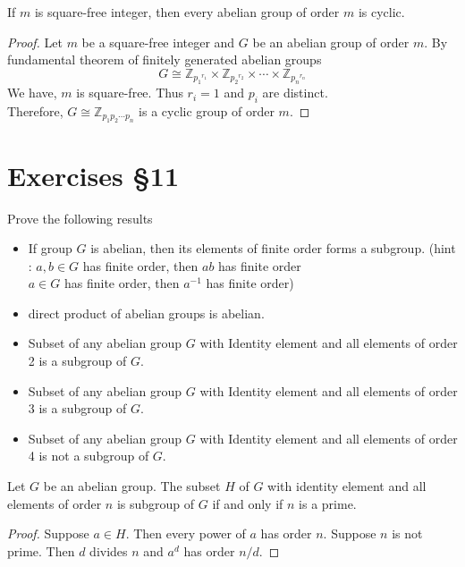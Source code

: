 \begin{theorem}
	If $m$ is square-free integer, then every abelian group of order $m$ is cyclic.
\end{theorem}
\begin{proof}
	Let $m$ be a square-free integer and $G$ be an abelian group of order $m$.
	By fundamental theorem of finitely generated abelian groups
	$$ G \cong \mathbb{Z}_{{p_1}^{r_1}} \times \mathbb{Z}_{{p_2}^{r_2}} \times \cdots \times \mathbb{Z}_{{p_n}^{r_n}}$$
	We have, $m$ is square-free. Thus $r_i = 1$ and $p_i$ are distinct.\\
	Therefore, $G \cong \mathbb{Z}_{p_1 p_2 \cdots p_n}$ is a cyclic group of order $m$.
\end{proof}
\pagebreak

\section{Exercises \S11}
\begin{remark}Prove the following results
	\begin{itemize}
		\item If group $G$ is abelian, then its elements of finite order forms a subgroup. %
			(hint : $a,b \in G$ has finite order, then $ab$ has finite order\\ $a \in G$ has finite order, then $a^{-1}$ has finite order)
		\item direct product of abelian groups is abelian.%
		\item Subset of any abelian group $G$ with Identity element and all elements of order 2 is a subgroup of $G$.%
		\item Subset of any abelian group $G$ with Identity element and all elements of order 3 is a subgroup of $G$.%
		\item Subset of any abelian group $G$ with Identity element and all elements of order 4 is not a subgroup of $G$.%
	\end{itemize}
\end{remark}

\begin{remark}
	Let $G$ be an abelian group. The subset $H$ of $G$ with identity element and all elements of order $n$ is subgroup of $G$ if and only if $n$ is a prime. %
\end{remark}
\begin{proof}
	Suppose $a \in H$. Then every power of $a$ has order $n$. Suppose $n$ is not prime. Then $d$ divides $n$ and $a^d$ has order $n/d$.
\end{proof}


